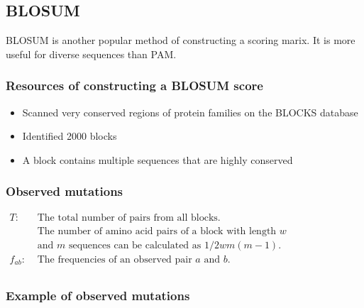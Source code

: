 %
%

%
%
\subsection{BLOSUM}
BLOSUM is another popular method of constructing a scoring marix. It is more useful for diverse sequences than PAM.

%
%
\subsubsection*{Resources of constructing a BLOSUM score}
\begin{itemize}
\item Scanned very conserved regions of protein families on the BLOCKS database
\item Identified 2000 blocks
\item A block contains multiple sequences that are highly conserved
\end{itemize}

%
%
\subsubsection*{Observed mutations}

\begin{center}
$\begin{aligned}
T : & \text{ The total number of pairs from all blocks.} \\
& \text{ The number of amino acid pairs of a block with length } w \\
& \text{ and } m \text{ sequences can be calculated as } 1/2wm(m-1). \\
f_{ab} : & \text{ The frequencies of an observed pair } a \text{ and } b.\\
\end{aligned} $
\end{center}

%
%
\subsubsection*{Example of observed mutations}


